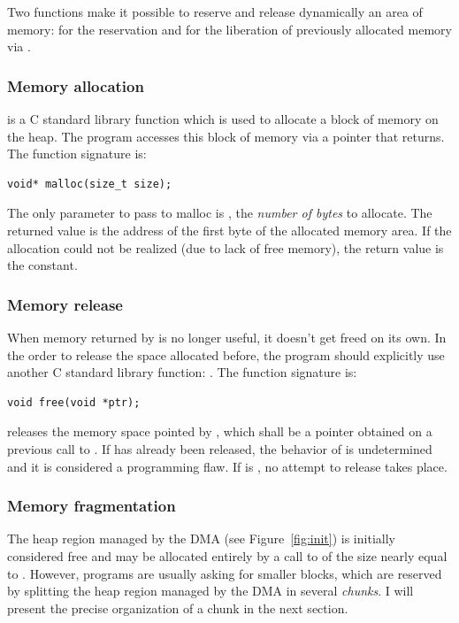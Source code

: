 Two functions make it possible to reserve and release dynamically an area of memory:  for the reservation and  for the liberation of previously allocated memory via .

\subsubsection{Memory allocation}
 is a C standard library function which is used to allocate a block of memory on the heap. The program accesses this block of memory via a pointer that  returns.
The function signature is:

\begin{lstlisting}[style=cstyle]
void* malloc(size_t size);
\end{lstlisting}

The only parameter to pass to malloc is , the \emph{number of bytes} to allocate. The returned value is the address of the first byte of the allocated memory area. If the allocation could not be realized (due to lack of free memory), the return value is the  constant.

\subsubsection{Memory release}
When memory returned by  is no longer useful, it doesn't get freed on its own. In the order to release the space allocated before, the program should explicitly use another C standard library function: .
The function signature is:
\begin{lstlisting}[style=cstyle]
void free(void *ptr);
\end{lstlisting}
 releases the memory space pointed by , which shall be a pointer obtained on a previous call to . If  has already been released, the behavior of  is undetermined and it is considered a programming flaw. If  is , no attempt to release takes place.


\subsubsection{Memory fragmentation}
The heap region managed by the DMA (see Figure~\ref{fig:init}) is initially considered free  and may be allocated entirely by a call to  of the size nearly equal to .
However, programs are usually asking for smaller blocks, which are reserved by splitting the  heap region managed by the DMA in several \emph{chunks}. I will present the precise organization of a chunk in the next section.

